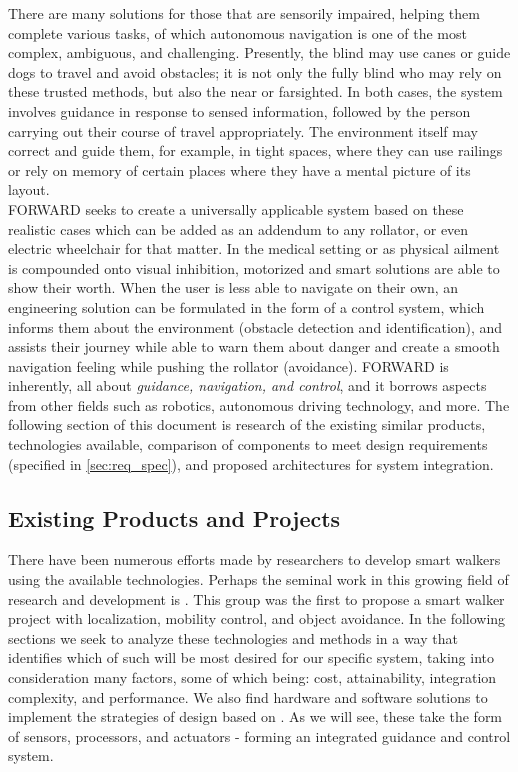 \noindent There are many solutions for those that are sensorily impaired, helping them complete various tasks, of which autonomous navigation is one of the most complex, ambiguous, and challenging. Presently, the blind may use canes or guide dogs to travel and avoid obstacles; it is not only the fully blind who may rely on these trusted methods, but also the near or farsighted.  In both cases, the system involves guidance in response to sensed information, followed by the person carrying out their course of travel appropriately. The environment itself may correct and guide them, for example, in tight spaces, where they can use railings or rely on memory of certain places where they have a mental picture of its layout.\\

\noindent FORWARD seeks to create a universally applicable system based on these realistic cases which can be added as an addendum to any rollator, or even electric wheelchair for that matter. In the medical setting or as physical ailment is compounded onto visual inhibition, motorized and smart solutions are able to show their worth. When the user is less able to navigate on their own, an engineering solution can be formulated in the form of a control system, which informs them about the environment (obstacle detection and identification), and assists their journey while able to warn them about danger and create a smooth navigation feeling while pushing the rollator (avoidance). FORWARD is inherently, all about \textit{guidance, navigation, and control}, and it borrows aspects from other fields such as robotics, autonomous driving technology, and more. The following section of this document is research of the existing similar products, technologies available, comparison of components to meet design requirements (specified in \ref{sec:req_spec}), and proposed architectures for system integration.

\subsection{Existing Products and Projects}
\noindent There have been numerous efforts made by researchers to develop smart walkers using the available technologies. Perhaps the seminal work in this growing field of research and development is \cite{PAMM}. This group was the first to propose a smart walker project with localization, mobility control, and object avoidance. In the following sections we seek to analyze these technologies and methods in a way that identifies which of such will be most desired for our specific system, taking into consideration many factors, some of which being: cost, attainability, integration complexity, and performance. We also find hardware and software solutions to implement the strategies of design based on \cite{PAMM}. As we will see, these take the form of sensors, processors, and actuators - forming an integrated guidance and control system.

